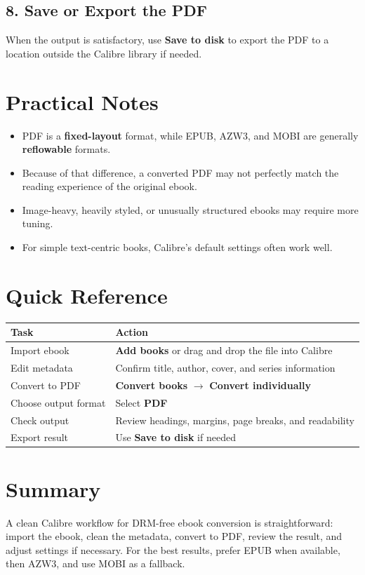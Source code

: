 \documentclass[11pt]{article}
\begin{document}
\subsection{8. Save or Export the PDF}

When the output is satisfactory, use \textbf{Save to disk} to export the PDF to a location outside the Calibre library if needed.

\section{Practical Notes}

\begin{itemize}
    \item PDF is a \textbf{fixed-layout} format, while EPUB, AZW3, and MOBI are generally \textbf{reflowable} formats.
    \item Because of that difference, a converted PDF may not perfectly match the reading experience of the original ebook.
    \item Image-heavy, heavily styled, or unusually structured ebooks may require more tuning.
    \item For simple text-centric books, Calibre's default settings often work well.
\end{itemize}

\section{Quick Reference}

\begin{center}
\begin{tabularx}{\textwidth}{>{\raggedright\arraybackslash}p{} X}
\toprule
\textbf{Task} & \textbf{Action} \\
\midrule
Import ebook & \textbf{Add books} or drag and drop the file into Calibre \\
Edit metadata & Confirm title, author, cover, and series information \\
Convert to PDF & \textbf{Convert books} $\rightarrow$ \textbf{Convert individually} \\
Choose output format & Select \textbf{PDF} \\
Check output & Review headings, margins, page breaks, and readability \\
Export result & Use \textbf{Save to disk} if needed \\
\bottomrule
\end{tabularx}
\end{center}

\section{Summary}

A clean Calibre workflow for DRM-free ebook conversion is straightforward: import the ebook, clean the metadata, convert to PDF, review the result, and adjust settings if necessary. For the best results, prefer EPUB when available, then AZW3, and use MOBI as a fallback.
\end{document}
